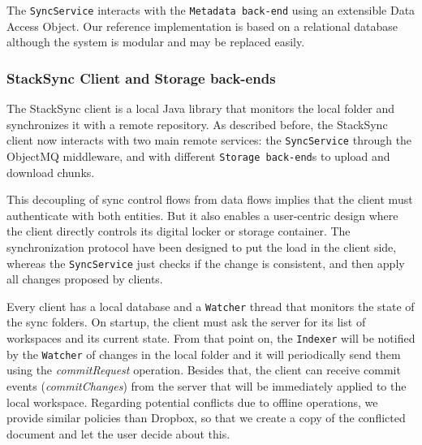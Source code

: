 The \texttt{SyncService} interacts with the \texttt{Metadata back-end} using an extensible Data Access Object. Our reference implementation is based on a relational database although the system is modular and may be replaced easily.



\subsubsection{StackSync Client and Storage back-ends}


The StackSync client is a local Java library that monitors the local folder and synchronizes it with a remote repository. 
As described before, the StackSync client now interacts with two main remote services: the \texttt{SyncService} 
through the ObjectMQ middleware, and with different \texttt{Storage back-end}s to upload and download chunks.

This decoupling of sync control flows from data flows implies that the client must authenticate with both entities. But it also enables a user-centric design where the client directly controls its digital locker or storage container.  The synchronization protocol have been designed to put the load in the client side, whereas the \texttt{SyncService} just checks if the change is consistent, and then apply all changes proposed by clients. 

Every client has a local database and a \texttt{Watcher} thread that monitors the state of the sync folders.  On startup, the client must ask the server for its list of workspaces and its current state. From that point on, the \texttt{Indexer} will be notified by the \texttt{Watcher} of  changes in the local folder and it will periodically send them using the \textit{commitRequest} operation. Besides that, the client can receive commit events (\textit{commitChanges}) from the server that will be immediately applied to the local workspace.  Regarding potential conflicts due to offline operations, we provide similar policies than Dropbox, so that we create a copy of the conflicted document and let the user decide about this. 


